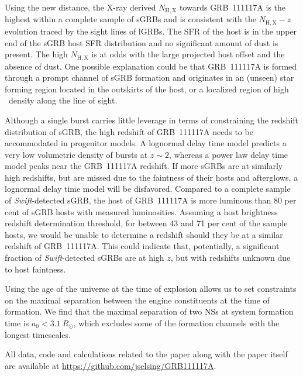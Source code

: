 \documentclass[referee]{aa}
\begin{document}
Using the new distance, the X-ray derived $N_\mathrm{H,X}$ towards GRB~111117A
is the highest within a complete sample of sGRBs and is consistent with the
$N_\mathrm{H,X}-z$ evolution traced by the sight lines of lGRBs. The SFR of the
host is in the upper end of the sGRB host SFR distribution and no significant
amount of dust is present. The high $N_\mathrm{H,X}$ is at odds with the large
projected host offset and the absence of dust. One possible explanation could be
that GRB~111117A is formed through a prompt channel of sGRB formation and
originates in an (unseen) star forming region located in the outskirts of the
host, or a localized region of high \hi~density along the line of sight.

Although a single burst carries little leverage in terms of constraining the
redshift distribution of sGRB, the high redshift of GRB~111117A needs to be
accommodated in progenitor models. A lognormal delay time model predicts a very
low volumetric density of bursts at $z \sim 2$, whereas a power law delay time
model peaks near the GRB~111117A redshift. If more sGRBs are at similarly high
redshifts, but are missed due to the faintness of their hosts and afterglows, a
lognormal delay time model will be disfavored. Compared to a complete sample of
\textit{Swift}-detected sGRB, the host of GRB~111117A is more luminous than 80
per cent of sGRB hosts with measured luminosities. Assuming a host brightness
redshift determination threshold, for between 43 and 71 per cent of the sample
hosts, we would be unable to determine a redshift should they be at a similar
redshift of GRB~111117A. This could indicate that, potentially, a significant
fraction of \textit{Swift}-detected sGRBs are at high $z$, but with redshifts
unknown due to host faintness.

Using the age of the universe at the time of explosion allows us to set
constraints on the maximal separation between the engine constituents at the
time of formation. We find that the maximal separation of two NSs at system
formation time is $a_0 < 3.1~R_\odot$, which excludes some of the formation
channels with the longest timescales.

All data, code and calculations related to the paper along with the
paper itself are available at \url{https://github.com/jselsing/GRB111117A}.
\end{document}
